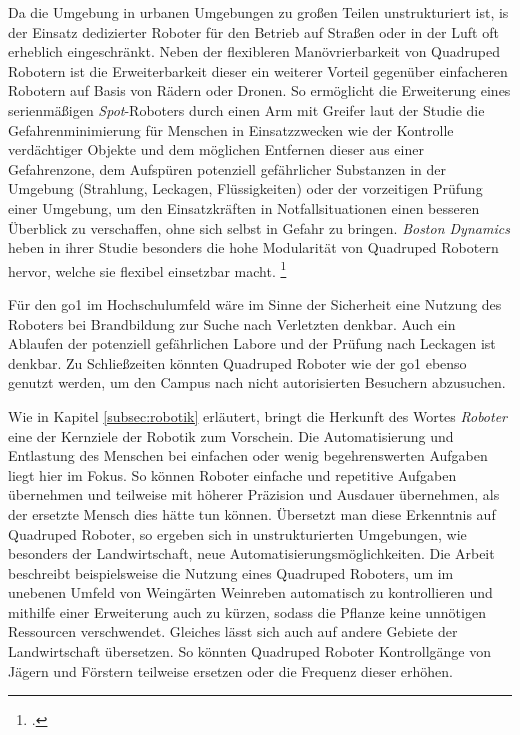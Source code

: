 
Da die Umgebung in urbanen Umgebungen zu großen Teilen unstrukturiert ist, is der Einsatz dedizierter Roboter für den
Betrieb auf Straßen oder in der Luft oft erheblich eingeschränkt.
Neben der flexibleren Manövrierbarkeit von Quadruped Robotern ist die Erweiterbarkeit
dieser ein weiterer Vorteil gegenüber einfacheren Robotern auf Basis von Rädern oder Dronen.
So ermöglicht die Erweiterung eines serienmäßigen \emph{Spot}-Roboters durch einen Arm mit Greifer laut der Studie
 die Gefahrenminimierung für Menschen in Einsatzzwecken wie der Kontrolle verdächtiger Objekte und dem
möglichen Entfernen dieser aus einer Gefahrenzone, dem Aufspüren potenziell gefährlicher Substanzen in der Umgebung (Strahlung, Leckagen, Flüssigkeiten)
oder der vorzeitigen Prüfung einer Umgebung, um den Einsatzkräften in Notfallsituationen einen besseren Überblick zu verschaffen,
ohne sich selbst in Gefahr zu bringen.
\emph{Boston Dynamics} heben in ihrer Studie besonders die hohe Modularität von Quadruped Robotern hervor, welche sie
flexibel einsetzbar macht.
\footcite{boston_dynamics_safety}

Für den \gls{go1} im Hochschulumfeld wäre im Sinne der Sicherheit eine Nutzung des Roboters bei Brandbildung zur Suche nach Verletzten denkbar.
Auch ein Ablaufen der potenziell gefährlichen Labore und der Prüfung nach Leckagen ist denkbar.
Zu Schließzeiten könnten Quadruped Roboter wie der \gls{go1} ebenso genutzt werden, um den Campus nach nicht autorisierten
Besuchern abzusuchen.


Wie in Kapitel \ref{subsec:robotik} erläutert, bringt die Herkunft des Wortes \emph{Roboter} eine der Kernziele der Robotik zum Vorschein.
Die Automatisierung und Entlastung des Menschen bei einfachen oder wenig begehrenswerten Aufgaben liegt hier im Fokus.
So können Roboter einfache und repetitive Aufgaben übernehmen und teilweise mit höherer Präzision und Ausdauer übernehmen,
als der ersetzte Mensch dies hätte tun können.
Übersetzt man diese Erkenntnis auf Quadruped Roboter, so ergeben sich in unstrukturierten Umgebungen, wie besonders der Landwirtschaft,
neue Automatisierungsmöglichkeiten.
Die Arbeit  beschreibt beispielsweise die Nutzung eines Quadruped Roboters, um im unebenen Umfeld
von Weingärten Weinreben automatisch zu kontrollieren und mithilfe einer Erweiterung auch zu kürzen, sodass die Pflanze
keine unnötigen Ressourcen verschwendet.
Gleiches lässt sich auch auf andere Gebiete der Landwirtschaft übersetzen.
So könnten Quadruped Roboter Kontrollgänge von Jägern und Förstern teilweise ersetzen oder die Frequenz dieser erhöhen.

